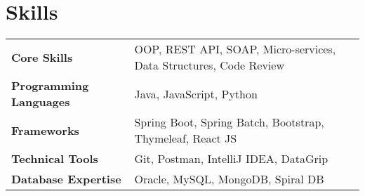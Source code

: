 \section{\textbf{Skills}}
\begin{tabularx}{\linewidth}{@{}l X@{}}
    \textbf{Core Skills} & \normalsize{OOP, REST API, SOAP, Micro-services, Data Structures, Code Review}
    \\ \textbf{Programming Languages} & \normalsize{Java, JavaScript, Python} \\
    \textbf{Frameworks} & \normalsize{Spring Boot, Spring Batch, Bootstrap, Thymeleaf, React JS}
    \\ \textbf{Technical Tools} & \normalsize{Git, Postman, IntelliJ IDEA, DataGrip}
    \\ \textbf{Database Expertise} & \normalsize{Oracle, MySQL, MongoDB, Spiral DB}
    \\
\end{tabularx}
